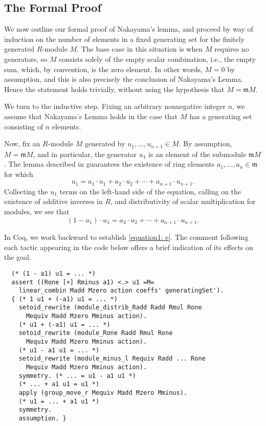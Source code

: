 \documentclass[referee,sn-mathphys]{sn-jnl}
\theoremstyle{definition}
\theoremstyle{remark}
\numberwithin{equation}{section}
\numberwithin{figure}{subsection}
\begin{document}
\subsection{The Formal Proof}
We now outline our formal proof of Nakayama's lemma, and  proceed
by way of induction on the number of elements in a fixed generating set for the finitely generated $R$-module
$M$. The base case in this situation is when \(M\) requires no generators, so $M$
consists solely of the empty scalar combination, i.e., the empty sum, which, by
convention, is the zero element. In other words, $M = 0$ by assumption, and
this is also precisely the conclusion of Nakayama's Lemma.  Hence the statement holds
trivially, without using the hypothesis that $M = \mathfrak{m} M$.

We turn to the inductive step.  Fixing an arbitrary nonnegative integer $n$, 
we assume that Nakayama's Lemma holds in the case that $M$ has a generating set 
consisting of $n$ elements. 

Now, fix an $R$-module $M$ generated by $u_1, \ldots, u_{n+1} \in M$. By
assumption, \(M = \mathfrak{m} M\), and in particular, the generator $u_1$ is
an element of the submodule $\mathfrak{m} M$. The lemma described in 
guarantees the existence of ring elements $a_1, \ldots, a_n \in \mathfrak{m}$
for which 
\[u_{1} = a_{1} \cdot u_{1} + a_2 \cdot u_2 + \cdots + a_{n+1} \cdot u_{n+1}.\]
Collecting the \(u_{1}\) terms on the left-hand side of the equation, calling on 
the existence of additive inverses in $R$, and distributivity of scalar
multiplication for modules, we see that
\begin{equation}\label{equation1: e}
(1 - a_{1}) \cdot u_{1} =
  a_{2} \cdot u_{2} + \cdots + a_{n+1} \cdot u_{n+1}\text{.}
\end{equation}

In Coq, we work backward to establish \eqref{equation1: e}. The comment following
each tactic appearing in the code below offers a brief indication of its effects on the goal.
\begin{verbatim}
  (* (1 - a1) u1 = ... *)
  assert ((Rone [+] Rminus a1) <.> u1 =M=
    linear_combin Madd Mzero action coeffs' generatingSet').
  { (* 1 u1 + (-a1) u1 = ... *)
    setoid_rewrite (module_distrib_Radd Radd Rmul Rone
      Mequiv Madd Mzero Mminus action).
    (* u1 + (-a1) u1 = ... *)
    setoid_rewrite (module_Rone Radd Rmul Rone
      Mequiv Madd Mzero Mminus action).
    (* u1 - a1 u1 = ... *)
    setoid_rewrite (module_minus_l Requiv Radd ... Rone
      Mequiv Madd Mzero Mminus action).
    symmetry. (* ... = u1 - a1 u1 *)
    (* ... + a1 u1 = u1 *)
    apply (group_move_r Mequiv Madd Mzero Mminus).
    (* u1 = ... + a1 u1 *)
    symmetry.
    assumption. }
\end{verbatim}
\end{document}
